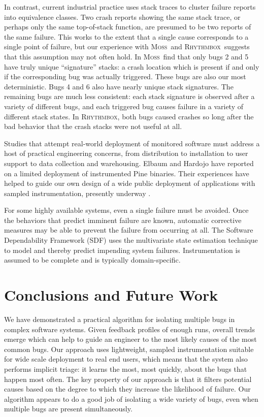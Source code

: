 \documentclass[10pt]{acmconfbig}
\newcommand{\moss}{\textsc{Moss}\xspace}
\newcommand{\rhythmbox}{\textsc{Rhythmbox}\xspace}
\begin{document}
In contrast, current
industrial practice uses stack traces to cluster failure reports into
equivalence classes.  Two crash reports showing the same stack trace,
or perhaps only the same top-of-stack function, are presumed to be two
reports of the same failure.  This works to the extent that a single
cause corresponds to a single point of failure, but our experience
with \moss\ and \rhythmbox\ suggests that this assumption may not often hold.  In \moss\ find
that only bugs 2 and 5 have truly unique ``signature'' stacks: a
crash location which is present if and only if the corresponding bug
was actually triggered.  These bugs are also our most deterministic.
Bugs 4 and 6 also have nearly unique stack signatures.
The remaining bugs are much less consistent: each stack signature is
observed after a variety of different bugs, and each triggered bug
causes failure in a variety of different stack states.  In \rhythmbox,
both bugs caused crashes so long after the bad behavior that the crash stacks
were not useful at all.

Studies that attempt real-world deployment of monitored software must
address a host of practical engineering concerns, from distribution to
installation to user support to data collection and warehousing.
Elbaum and Hardojo \cite{Elbaum:2003:DISATA} have reported on a
limited deployment of instrumented Pine binaries.  Their experiences
have helped to guide our own design of a wide public deployment of
applications with sampled instrumentation, presently underway
\cite{Liblit:2003:CBIP}.

For some highly available systems, even a single failure must be
avoided.  Once the behaviors that predict imminent failure are known,
automatic corrective measures may be able to prevent the failure from
occurring at all.  The Software Dependability Framework (SDF)
\cite{Gross:2003:PSMUST} uses the multivariate state estimation
technique to model and thereby predict impending system failures.
Instrumentation is assumed to be complete and is typically
domain-specific.

\section{Conclusions and Future Work}
\label{sec:conclusions}

We have demonstrated a practical algorithm for isolating multiple bugs
in complex software systems.  Given feedback profiles of enough runs,
overall trends emerge which can help to guide an engineer to the most
likely causes of the most common bugs.  Our approach uses lightweight,
sampled instrumentation suitable for wide scale deployment to real end
users, which means that the system also performs implicit triage: it
learns the most, most quickly, about the bugs that happen most often.
The key property of our approach is that it filters potential causes
based on the degree to which they increase the likelihood of failure.
Our algorithm appears to do a good job of isolating a wide variety of
bugs, even when multiple bugs are present simultaneously.
\end{document}
